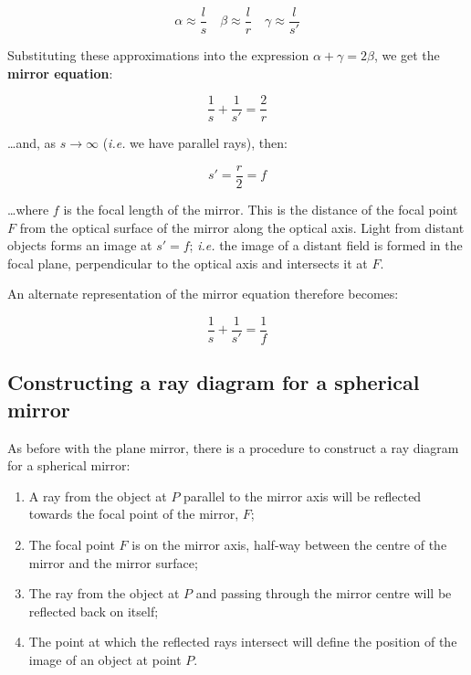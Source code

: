 \documentclass[
]{book}
\providecommand{\tightlist}{%
  \setlength{\itemsep}{0pt}\setlength{\parskip}{0pt}}
\begin{document}
\begin{equation}
\alpha \approx \frac{l}{s} \quad \beta \approx \frac{l}{r} \quad \gamma \approx \frac{l}{s'}
\end{equation}

Substituting these approximations into the expression \(\alpha + \gamma = 2\beta\), we get the \textbf{mirror equation}:

\begin{equation}
\frac{1}{s} + \frac{1}{s'} = \frac{2}{r}
\end{equation}

\ldots and, as \(s \rightarrow \infty\) (\emph{i.e.} we have parallel rays), then:

\begin{equation}
s' = \frac{r}{2} = f
\end{equation}

\ldots where \(f\) is the focal length of the mirror. This is the distance of the focal point \(F\) from the optical surface of the mirror along the optical axis. Light from distant objects forms an image at \(s' = f\); \emph{i.e.} the image of a distant field is formed in the focal plane, perpendicular to the optical axis and intersects it at \(F\).

An alternate representation of the mirror equation therefore becomes:

\begin{equation}
\frac{1}{s} + \frac{1}{s'} = \frac{1}{f}
\label{eq:ch15-mirrorequation1}
\end{equation}

\hypertarget{sec:ch15-raydiagramconcavesphericalmirror}{%
\subsection{Constructing a ray diagram for a spherical mirror}\label{sec:ch15-raydiagramconcavesphericalmirror}}

As before with the plane mirror, there is a procedure to construct a ray diagram for a spherical mirror:

\begin{enumerate}
\def\labelenumi{\arabic{enumi}.}
\tightlist
\item
  A ray from the object at \(P\) parallel to the mirror axis will be reflected towards the focal point of the mirror, \(F\);
\item
  The focal point \(F\) is on the mirror axis, half-way between the centre of the mirror and the mirror surface;
\item
  The ray from the object at \(P\) and passing through the mirror centre will be reflected back on itself;
\item
  The point at which the reflected rays intersect will define the position of the image of an object at point \(P\).
\end{enumerate}
\end{document}
